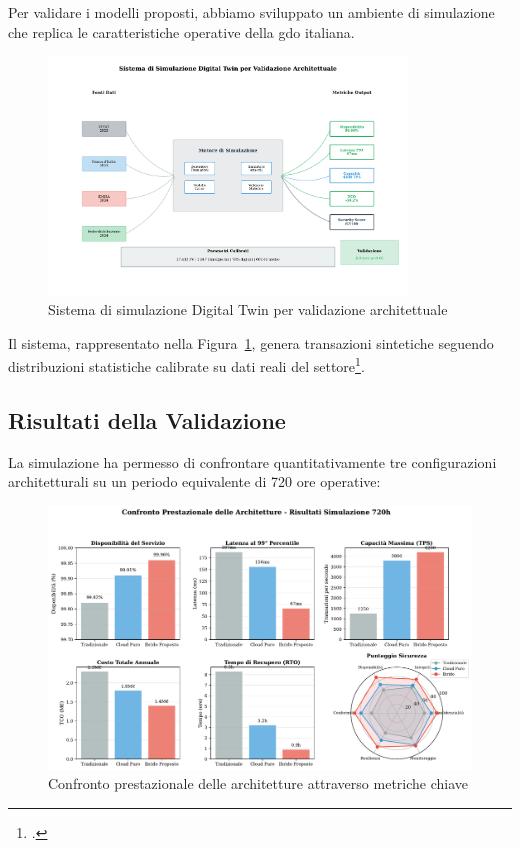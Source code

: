 Per validare i modelli proposti, abbiamo sviluppato un ambiente di simulazione che replica le caratteristiche operative della \gls{gdo} italiana.

\begin{figure}[htbp]
\centering
\includegraphics[width=0.85\textwidth]{thesis_figures/cap4/fig_3_4_simulation_system.pdf}
\caption{Sistema di simulazione Digital Twin per validazione architettuale}
\label{fig:simulation-system}
\end{figure}

Il sistema, rappresentato nella Figura~\ref{fig:simulation-system}, genera transazioni sintetiche seguendo distribuzioni statistiche calibrate su dati reali del settore\footcite{federdistribuzione2024}.

\subsection{Risultati della Validazione}
\label{subsec:risultati-validazione}

La simulazione ha permesso di confrontare quantitativamente tre configurazioni architetturali su un periodo equivalente di 720 ore operative:

\begin{figure}[htbp]
\centering
\includegraphics[width=\textwidth]{thesis_figures/cap4/fig_3_6_performance_comparison.pdf}
\caption{Confronto prestazionale delle architetture attraverso metriche chiave}
\label{fig:performance-comparison}
\end{figure}

